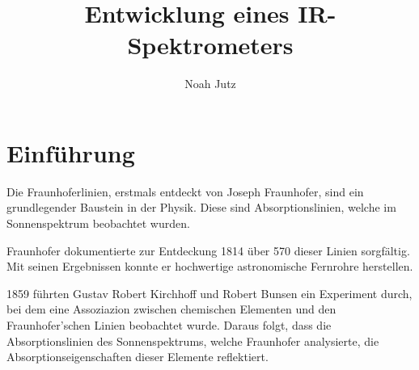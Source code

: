 \documentclass{article}
\title{Entwicklung eines IR-Spektrometers}
\author{Noah Jutz}
\date{}
\begin{document}
\maketitle
\tableofcontents


\section{Einführung}



Die Fraunhoferlinien, erstmals entdeckt von Joseph Fraunhofer, sind ein grundlegender Baustein in der Physik. Diese sind Absorptionslinien, welche im Sonnenspektrum beobachtet wurden.

Fraunhofer dokumentierte zur Entdeckung 1814 über 570 dieser Linien sorgfältig. Mit seinen Ergebnissen konnte er hochwertige astronomische Fernrohre herstellen.

1859 führten Gustav Robert Kirchhoff und Robert Bunsen ein Experiment durch, bei dem eine Assoziazion zwischen chemischen Elementen und den Fraunhofer'schen Linien beobachtet wurde. Daraus folgt, dass die Absorptionslinien des Sonnenspektrums, welche Fraunhofer analysierte, die Absorptionseigenschaften dieser Elemente reflektiert.



\end{document}
